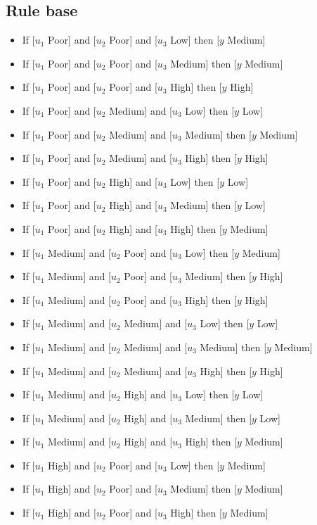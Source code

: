 \documentclass[conference]{IEEEtran}
\begin{document}
\subsection{Rule base}
\begin{itemize}
\item If [$u_1$ Poor] and [$u_2$ Poor] and [$u_3$ Low] then [$y$ Medium]
\item If [$u_1$ Poor] and [$u_2$ Poor] and [$u_3$ Medium] then [$y$ Medium]
\item If [$u_1$ Poor] and [$u_2$ Poor] and [$u_3$ High] then [$y$ High]
\item If [$u_1$ Poor] and [$u_2$ Medium] and [$u_3$ Low] then [$y$ Low]
\item If [$u_1$ Poor] and [$u_2$ Medium] and [$u_3$ Medium] then [$y$ Medium]
\item If [$u_1$ Poor] and [$u_2$ Medium] and [$u_3$ High] then [$y$ High]
\item If [$u_1$ Poor] and [$u_2$ High] and [$u_3$ Low] then [$y$ Low]
\item If [$u_1$ Poor] and [$u_2$ High] and [$u_3$ Medium] then [$y$ Low]
\item If [$u_1$ Poor] and [$u_2$ High] and [$u_3$ High] then [$y$ Medium]
\item If [$u_1$ Medium] and [$u_2$ Poor] and [$u_3$ Low] then [$y$ Medium]
\item If [$u_1$ Medium] and [$u_2$ Poor] and [$u_3$ Medium] then [$y$ High]
\item If [$u_1$ Medium] and [$u_2$ Poor] and [$u_3$ High] then [$y$ High]
\item If [$u_1$ Medium] and [$u_2$ Medium] and [$u_3$ Low] then [$y$ Low]
\item If [$u_1$ Medium] and [$u_2$ Medium] and [$u_3$ Medium] then [$y$ Medium]
\item If [$u_1$ Medium] and [$u_2$ Medium] and [$u_3$ High] then [$y$ High]
\item If [$u_1$ Medium] and [$u_2$ High] and [$u_3$ Low] then [$y$ Low]
\item If [$u_1$ Medium] and [$u_2$ High] and [$u_3$ Medium] then [$y$ Low]
\item If [$u_1$ Medium] and [$u_2$ High] and [$u_3$ High] then [$y$ Medium]
\item If [$u_1$ High] and [$u_2$ Poor] and [$u_3$ Low] then [$y$ Medium]
\item If [$u_1$ High] and [$u_2$ Poor] and [$u_3$ Medium] then [$y$ Medium]
\item If [$u_1$ High] and [$u_2$ Poor] and [$u_3$ High] then [$y$ Medium]

\end{itemize}
\end{document}
